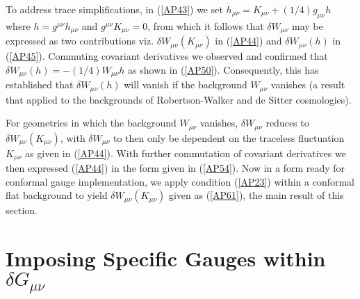 To address trace simplifications, in (\ref{AP43}) we set  $h_{\mu\nu}=K_{\mu\nu}+(1/4)g_{\mu\nu}h$ where $h=g^{\mu\nu}h_{\mu\nu}$ and $g^{\mu\nu}K_{\mu\nu}=0$, from which it follows that $\delta W_{\mu\nu}$ may be expressed as two contributions viz. $\delta W_{\mu\nu}(K_{\mu\nu})$ in (\ref{AP44}) and $\delta W_{\mu\nu}(h)$ in (\ref{AP45}). Commuting covariant derivatives we observed and confirmed that $\delta W_{\mu\nu}(h)=-(1/4)W_{\mu\nu}h$ as shown in (\ref{AP50}). Consequently, this has established that $\delta W_{\mu\nu}(h)$ will vanish if the background $W_{\mu\nu}$ vanishes (a result that applied to the backgrounds of Robertson-Walker and de Sitter cosmologies).

For geometries in which the background $W_{\mu\nu}$ vanishes, $\delta W_{\mu\nu}$ reduces to $\delta W_{\mu\nu}(K_{\mu\nu})$, with $\delta W_{\mu\nu}$ to then only be dependent on the traceless fluctuation $K_{\mu\nu}$ as given in (\ref{AP44}). With further commutation of covariant derivatives we then expressed (\ref{AP44}) in the form given in (\ref{AP54}). Now in a form ready for conformal gauge implementation, we apply condition (\ref{AP23}) within a conformal flat background to yield $\delta W_{\mu\nu}(K_{\mu\nu})$ given as (\ref{AP61}), the main result of this section.


\section{Imposing Specific Gauges within $\delta G_{\mu\nu}$}
\label{s:compact_expressions_ein}

